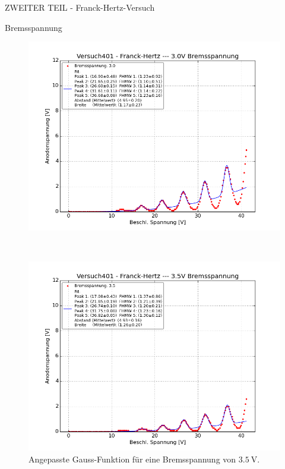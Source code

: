 \begin{appendix}
\begin{chapter}{ZWEITER TEIL - Franck-Hertz-Versuch}
\begin{section}{Bremsspannung}
\begin{figure}[htbp!]
\begin{minipage}{0.48\textwidth}
          \label{fig:AnhangFHB25V}
        \end{minipage} \quad
        \begin{minipage}{0.48\textwidth}
          \centering
          \includegraphics[width=\textwidth]
              {Figures/Versuch401-Franck-Hertz-3_0VBremsspannung_Beschl_Spannung_Anodenspannung.png}
          \caption{Angepasste Gauss-Funktion für eine Bremsspannung von 
              $\SI{3.0}{\volt}$.}
          \label{fig:AnhangFHB30V}
        \end{minipage} \\
        \begin{minipage}{0.48\textwidth}
          \centering
          \includegraphics[width=\textwidth]
              {Figures/Versuch401-Franck-Hertz-3_5VBremsspannung_Beschl_Spannung_Anodenspannung.png}
          \caption{Angepasste Gauss-Funktion für eine Bremsspannung von 
              $\SI{3.5}{\volt}$.}
          \label{fig:AnhangFHB35V}
        \end{minipage}
      \end{figure}
      

\end{section}
\end{chapter}
\end{appendix}

